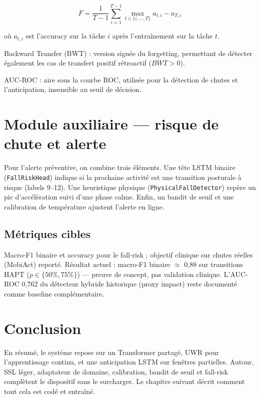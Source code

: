 $$F = \frac{1}{T-1} \sum_{i=1}^{T-1} \max_{t \in \{i,\ldots,T\}} a_{t,i} - a_{T,i}$$

où $a_{t,i}$ est l'accuracy sur la tâche $i$ après l'entraînement sur la tâche $t$.

Backward Transfer (BWT) : version signée du forgetting, permettant de détecter également les cas de transfert positif rétroactif ($BWT > 0$).

AUC-ROC : aire sous la courbe ROC, utilisée pour la détection de chutes et l'anticipation, insensible au seuil de décision.

\section{Module auxiliaire — risque de chute et alerte}

Pour l'alerte préventive, on combine trois éléments. Une tête LSTM binaire
(\texttt{FallRiskHead}) indique si la prochaine activité est une transition
posturale à risque (labels 9--12). Une heuristique physique
(\texttt{PhysicalFallDetector}) repère un pic d'accélération suivi d'une
phase calme. Enfin, un bandit de seuil et une calibration de température
ajustent l'alerte en ligne.

\subsection{Métriques cibles}

Macro-F1 binaire et accuracy pour le fall-risk ; objectif clinique sur chutes
réelles (MobiAct) reporté. Résultat actuel : macro-F1 binaire $\approx$ 0,88
sur transitions HAPT ($p\in\{50\%,75\%\}$) — preuve de concept, pas validation
clinique. L'AUC-ROC 0,762 du détecteur hybride historique (proxy impact)
reste documenté comme baseline complémentaire.

\section{Conclusion}

En résumé, le système repose sur un Transformer partagé, UWR pour l'apprentissage
continu, et une anticipation LSTM sur fenêtres partielles. Autour, SSL léger,
adaptateur de domaine, calibration, bandit de seuil et fall-risk complètent
le dispositif sans le surcharger. Le chapitre suivant décrit comment tout
cela est codé et entraîné.
